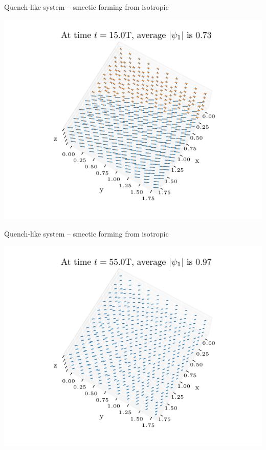 \documentclass[10pt,mathserif]{beamer}
\begin{document}
\begin{frame}[fragile]{Quench-like system -- smectic forming from isotropic}
    \newrefsection
    \begin{center}
        \includegraphics{figures/data_plots/fiso_r7_sample_2.pdf}
    \end{center}
\end{frame}

\begin{frame}[fragile]{Quench-like system -- smectic forming from isotropic}
    \newrefsection
    \begin{center}
        \includegraphics{figures/data_plots/fiso_r7_sample_3.pdf}
    \end{center}
\end{frame}
\end{document}
